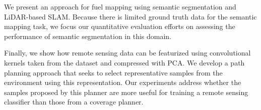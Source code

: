 We present an approach for fuel mapping using semantic segmentation and LiDAR-based SLAM. Because there is limited ground truth data for the semantic mapping task, we focus our quantitative evaluation efforts on assessing the performance of semantic segmentation in this domain. 

Finally, we show how remote sensing data can be featurized using convolutional kernels taken from the dataset and compressed with PCA. We develop a path planning approach that seeks to select representative samples from the environment using this representation. Our experiments address whether the samples proposed by this planner are more useful for training a remote sensing classifier than those from a coverage planner. 

